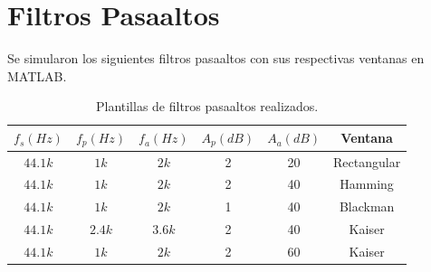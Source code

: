 \section{Filtros Pasaaltos}
Se simularon los siguientes filtros pasaaltos con sus respectivas ventanas en MATLAB.

\begin{table}[H]
\centering
\begin{tabular}{|c|c|c|c|c|c|}
\hline
$f_s(Hz)$ & $f_p(Hz)$ & $f_a(Hz)$ & $A_p(dB)$ & $A_a(dB)$ & Ventana     \\ \hline
$44.1k$   & $1k$      & $2k$      & 2         & 20        & Rectangular \\
$44.1k$   & $1k$      & $2k$      & 2         & 40        & Hamming     \\
$44.1k$   & $1k$      & $2k$      & 1         & 40        & Blackman    \\
$44.1k$   & $2.4k$    & $3.6k$    & 2         & 40        & Kaiser      \\
$44.1k$   & $1k$      & $2k$      & 2         & 60        & Kaiser      \\ \hline
\end{tabular}
\caption{Plantillas de filtros pasaaltos realizados.}
\label{tab:plantillaspasaaltos}
\end{table}

